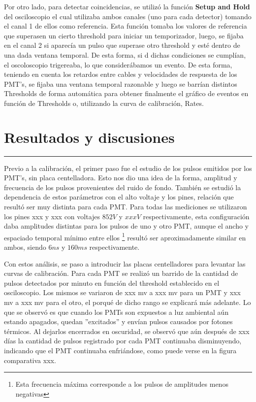 \documentclass[12pt,a4paper]{article}
\numberwithin{equation}{section}
\begin{document}
Por otro lado, para detectar coincidencias, se utilizó la función \textbf{Setup and Hold} del osciloscopio el cual utilizaba ambos canales (uno para cada detector) tomando el canal 1 de ellos como referencia. Esta función tomaba los valores de referencia que superasen un cierto threshold para iniciar un temporizador, luego, se fijaba en el canal 2 si aparecía un pulso que superase otro threshold y esté dentro de una dada ventana temporal. De esta forma, si d dichas condiciones se cumplían, el oscoloscopio trigereaba, lo que considerábamos un evento. De esta forma, teniendo en cuenta los retardos entre cables y velocidades de respuesta de los PMT's, se  fijaba una ventana temporal razonable y luego se barrían distintos Thresholds de forma automática para obtener finalmente el gráfico de eventos en función de Thresholds o, utilizando la curva de calibración, Rates.

\section{Resultados y discusiones}

\begin{center}
\rule{\textwidth}{0.2pt}
\end{center}

Previo a la calibración, el primer paso fue el estudio de los pulsos emitidos por los PMT's, sin placa centelladora. Esto nos dio una idea de la forma, amplitud y frecuencia de los pulsos provenientes del ruido de fondo. También se estudió la dependencia de estos parámetros con el alto voltaje y los pines, relación que resultó ser muy distinta para cada PMT. Para todas las mediciones se utilizaron los pines xxx y xxx con voltajes $ 852V $ y $ xxxV $ respectivamente, esta configuración daba amplitudes distintas para los pulsos de uno y otro PMT, aunque el ancho y espaciado temporal mínimo entre ellos \footnote{Esta frecuencia máxima corresponde a los pulsos de amplitudes menos negativas} resultó ser aproximadamente similar en ambos, siendo $ 6 ns $ y $ 160 ms $ respectivamente.

Con estos análisis, se paso a introducir las placas centelladores para levantar las curvas de calibración. Para cada PMT se realizó un barrido de la cantidad de pulsos detectados por minuto en función del threshold establecido en el osciloscopio. Los mismos se variaron de xxx mv a xxx mv para un PMT y xxx mv a xxx mv para el otro, el porqué de dicho rango se explicará más adelante. Lo que se observó es que cuando los PMTs son expuestos a luz ambiental aún estando apagados, quedan ''excitados'' y envían pulsos causados por fotones térmicos. Al dejarlos encerrados en oscuridad, se observó que aún después de xxx días la cantidad de pulsos registrado por cada PMT continuaba disminuyendo, indicando que el PMT continuaba enfriándose, como puede verse en la figura comparativa xxx.\\
\end{document}
